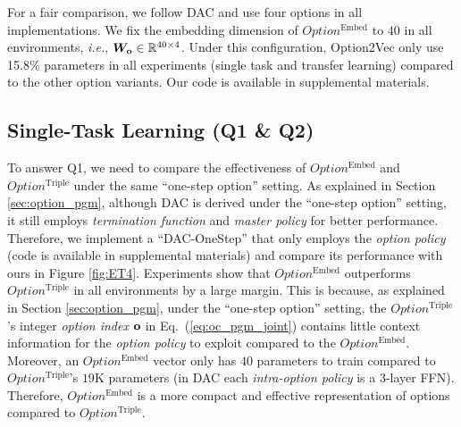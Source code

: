 \documentclass[10pt,journal,compsoc]{IEEEtran}
\begin{document}
For a fair comparison, we follow DAC and use four options in all
implementations. We fix the embedding dimension of
$Option^{\textrm{Embed}}$ to $40$ in all environments, \textit{i.e.},
${\bm{W}}_{{\mathbf{o}}}\in {\mathbb{R}}^{40\times 4}$. Under this configuration,
Option2Vec only use 15.8\% parameters in all experiments (single
task and transfer learning) compared to the other option
variants. Our code is available in supplemental materials.

\subsection{Single-Task Learning (Q1 \& Q2)}
\label{sec:exp_perf}
To answer Q1, we need to compare the effectiveness of
$Option^{\textrm{Embed}}$ and $Option^{\textrm{Triple}}$ under the same ``one-step
option'' setting. As explained in Section \ref{sec:option_pgm},
although DAC is derived under the ``one-step option'' setting, it still employs \emph{termination
  function} and \emph{master policy} for better performance. Therefore, we
implement a ``DAC-OneStep'' that only employs the \emph{option policy} (code is available in supplemental
materials) and compare its performance with ours in Figure
\ref{fig:ET4}. Experiments show that $Option^{\textrm{Embed}}$
outperforms $Option^{\textrm{Triple}}$ in all environments by a
large margin. This is because, as explained in Section
\ref{sec:option_pgm}, under the ``one-step option'' setting, the
$Option^{\textrm{Triple}}$'s integer \emph{option index} ${\mathbf{o}}$
in Eq.~(\ref{eq:oc_pgm_joint}) contains little context information for the \emph{option policy}
to exploit compared to the $Option^{\textrm{Embed}}$. Moreover,
an $Option^{\textrm{Embed}}$ vector only has $40$ parameters to
train compared to $Option^{\textrm{Triple}}$'s $19$K parameters
(in DAC each \emph{intra-option policy} is a 3-layer FFN). Therefore, $Option^{\textrm{Embed}}$ is a more compact and
effective representation of options compared to
$Option^{\textrm{Triple}}$.
\end{document}

